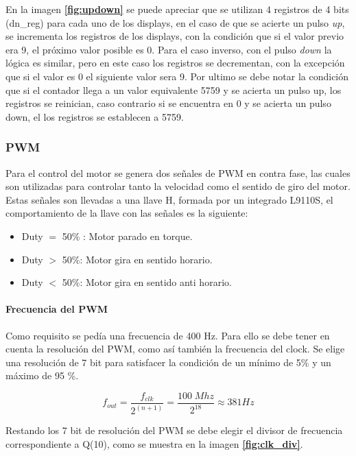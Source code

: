 \documentclass[11pt, a4paper]{article}
\begin{document}
		En la imagen \textcolor{blue}{\textbf{\ref{fig:updown}}} se puede apreciar que se utilizan 4 registros de 4 bits (dn\_reg) para cada uno de los displays, en el caso de que se acierte un pulso \textit{up}, se incrementa los registros de los displays, con la condición que si el valor previo era 9, el próximo valor posible es 0. Para el caso inverso, con el pulso \textit{down} la lógica es similar, pero en este caso los registros se decrementan, con la excepción que si el valor es 0 el siguiente valor sera 9.
		Por ultimo se debe notar la condición que si el contador llega a un valor equivalente 5759 y se acierta un pulso up, los registros se reinician, caso contrario si se encuentra en 0 y se acierta un pulso down, el los registros se establecen a 5759.
	
	\subsubsection{PWM}
			Para el control del motor se genera dos señales de PWM en contra fase, las cuales son utilizadas para controlar tanto la velocidad como el sentido de giro del motor. Estas señales son llevadas a una llave H, formada por un integrado L9110S, el comportamiento de la llave con las señales es la siguiente:
			\begin{itemize}
				\item{Duty $=$ 50\%} : Motor parado en torque.
				\item{Duty $>$ 50\%}: Motor gira en sentido horario.
				\item{Duty $<$ 50\%}: Motor gira en sentido anti horario.
			\end{itemize}

		\paragraph{Frecuencia del PWM}
				Como requisito se pedía una frecuencia de 400 Hz. Para ello se debe tener en cuenta la resolución del PWM, como así también la frecuencia del clock. Se elige una resolución de 7 bit para satisfacer la condición de un mínimo de 5\% y un máximo de 95 \%. 

				\begin{equation}
					f_{out} = \frac{f_{clk}}{2^{(n+1)}} = \frac{100\;Mhz}{2^18} \approx 381 Hz
				\end{equation}
	
				Restando los 7 bit de resolución del PWM se debe elegir el divisor de frecuencia correspondiente a Q(10), como se muestra en la imagen \textcolor{blue}{\textbf{\ref{fig:clk_div}}}.
\end{document}
